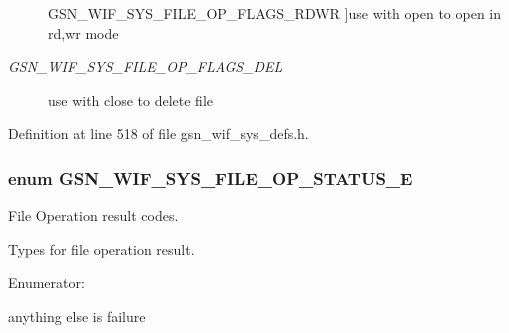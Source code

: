 \begin{Desc}
\begin{description}
{\hypertarget{a00639_ggac5b276b2a9ea66f27afb0f35e0e75257aea0bd02aef90199065c6bbe0d4c84c21}{
GSN\_\-WIF\_\-SYS\_\-FILE\_\-OP\_\-FLAGS\_\-RDWR}
\label{a00639_ggac5b276b2a9ea66f27afb0f35e0e75257aea0bd02aef90199065c6bbe0d4c84c21}
}]use with open to open in rd,wr mode \item[{\em 
\hypertarget{a00639_ggac5b276b2a9ea66f27afb0f35e0e75257acaacf27fc6f8dbce410f3651a6d9952c}{
GSN\_\-WIF\_\-SYS\_\-FILE\_\-OP\_\-FLAGS\_\-DEL}
\label{a00639_ggac5b276b2a9ea66f27afb0f35e0e75257acaacf27fc6f8dbce410f3651a6d9952c}
}]use with close to delete file \end{description}
\end{Desc}



Definition at line 518 of file gsn\_\-wif\_\-sys\_\-defs.h.

\hypertarget{a00639_ga4ab9f7b6980d4b5c3f3a0199250b8923}{
\subsubsection[{GSN\_\-WIF\_\-SYS\_\-FILE\_\-OP\_\-STATUS\_\-E}]{\setlength{\rightskip}{0pt plus 5cm}enum {\bf GSN\_\-WIF\_\-SYS\_\-FILE\_\-OP\_\-STATUS\_\-E}}}
\label{a00639_ga4ab9f7b6980d4b5c3f3a0199250b8923}


File Operation result codes. 

Types for file operation result. \begin{Desc}
\item[Enumerator: ]\par
\begin{description}
\item[{\em 
\hypertarget{a00639_gga4ab9f7b6980d4b5c3f3a0199250b8923a8f28cfe76fca5043418aaa6eaeec9e0a}{
GSN\_\-WIF\_\-SYS\_\-FILE\_\-OP\_\-STATUS\_\-SUCCESS}
\label{a00639_gga4ab9f7b6980d4b5c3f3a0199250b8923a8f28cfe76fca5043418aaa6eaeec9e0a}
}]anything else is failure \end{description}
\end{Desc}



